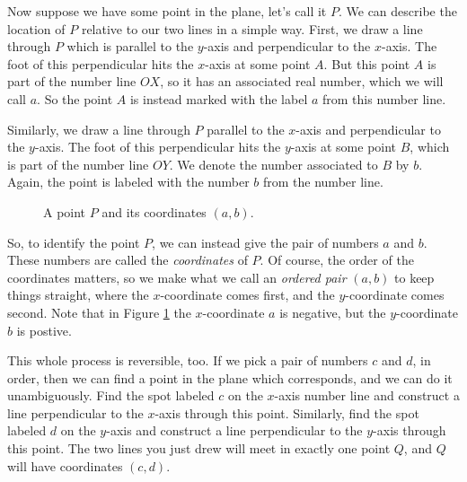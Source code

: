 \documentclass[00-livre-main.tex]{subfiles}
\begin{document}
Now suppose we have some point in the plane, let's call it $P$.
We can describe the location of $P$ relative to our two lines in a simple way. First, we draw a line through $P$ which is parallel to the $y$-axis and perpendicular to the $x$-axis.
The foot of this perpendicular hits the $x$-axis at some point $A$.
But this point $A$ is part of the number line $OX$, so it has an associated real number, which we will call $a$.
So the point $A$ is instead marked with the label $a$ from this number line.

Similarly, we draw a line through $P$ parallel to the $x$-axis and perpendicular to the $y$-axis.
The foot of this perpendicular hits the $y$-axis at some point $B$, which is part of the number line $OY$.
We denote the number associated to $B$ by $b$.
Again, the point is labeled with the number $b$ from the number line.

\begin{figure}[h!]
\centering
{}
\caption{A point $P$ and its coordinates $(a,b)$.}
\label{fig:point-coords}
\end{figure}

So, to identify the point $P$, we can instead give the pair of numbers $a$ and $b$.
These numbers are called the \emph{coordinates} of $P$.
Of course, the order of the coordinates matters, so we make what we call an \emph{ordered pair} $(a,b)$ to keep things straight, where the $x$-coordinate comes first, and the $y$-coordinate comes second. Note that in Figure \ref{fig:point-coords} the $x$-coordinate $a$ is negative, but the $y$-coordinate $b$ is postive.

This whole process is reversible, too. If we pick a pair of numbers $c$ and $d$, in order, then we can find a point in the plane which corresponds, and we can do it unambiguously. Find the spot labeled $c$ on the $x$-axis number line and construct a line perpendicular to the $x$-axis through this point. Similarly, find the spot labeled $d$ on the $y$-axis and construct a line perpendicular to the $y$-axis through this point. The two lines you just drew will meet in exactly one point $Q$, and $Q$ will have coordinates $(c,d)$.
\end{document}
